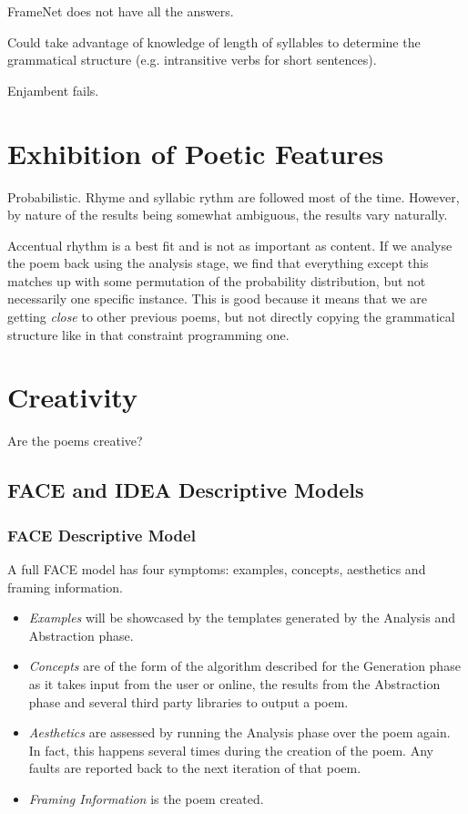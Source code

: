 FrameNet does not have all the answers.

Could take advantage of knowledge of length of syllables to determine the grammatical structure (e.g. intransitive verbs for short sentences).

Enjambent fails.

\section{Exhibition of Poetic Features}
Probabilistic. Rhyme and syllabic rythm are followed most of the time. However, by nature of the results being somewhat ambiguous, the results vary naturally.

Accentual rhythm is a best fit and is not as important as content. If we analyse the poem back using the analysis stage, we find that everything except this matches up with some permutation of the probability distribution, but not necessarily one specific instance. This is good because it means that we are getting \textit{close} to other previous poems, but not directly copying the grammatical structure like in that constraint programming one.

\section{Creativity}
Are the poems creative?
\subsection{FACE and IDEA Descriptive Models}
\subsubsection{FACE Descriptive Model}
\label{sec:face}
A full FACE model has four symptoms: examples, concepts, aesthetics and framing information.

\begin{itemize}
\setlength{\itemsep}{0pt}
\item{\emph{Examples} will be showcased by the templates generated by the Analysis and Abstraction phase.}
\item{\emph{Concepts} are of the form of the algorithm described for the Generation phase as it takes input from the user or online, the results from the Abstraction phase and several third party libraries to output a poem.}
\item{\emph{Aesthetics} are assessed by running the Analysis phase over the poem again. In fact, this happens several times during the creation of the poem. Any faults are reported back to the next iteration of that poem.}
\item{\emph{Framing Information} is the poem created.}
\end{itemize}

